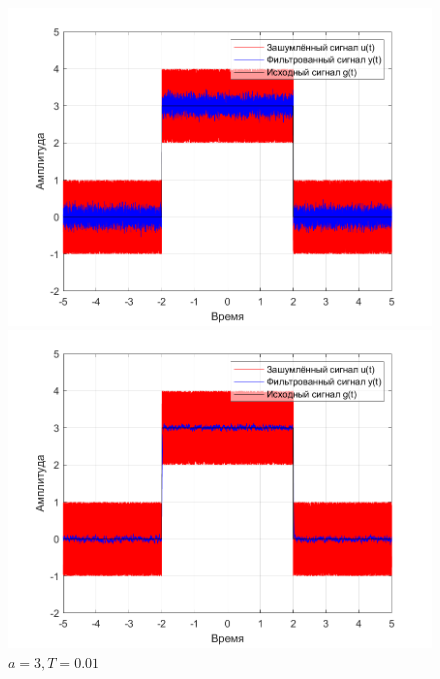 \documentclass[a4paper]{article}
\begin{document}
\begin{figure}[H]
    \begin{minipage}{0.5\textwidth}
        \centering
        \includegraphics[width=\linewidth]{ex1_1/a=3_T=0.001/h1.png}
        \caption{$a = 3, T = 0.001$}
    \end{minipage}
    \begin{minipage}{0.5\textwidth}
        \centering
        \includegraphics[width=\linewidth]{ex1_1/a=3_T=0.01/h1.png}
        \caption{$a = 3, T = 0.01$}
    \end{minipage}
\end{figure}
\end{document}
